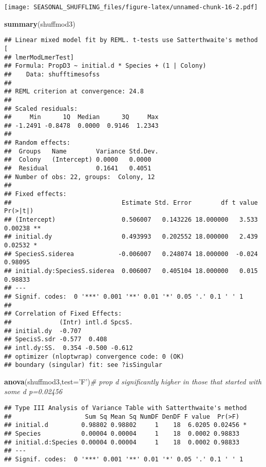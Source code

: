 \documentclass[]{article}
\newenvironment{Shaded}{\begin{snugshade}}{\end{snugshade}}
\newcommand{\CommentTok}[1]{\textcolor[rgb]{0.56,0.35,0.01}{\textit{#1}}}
\newcommand{\DataTypeTok}[1]{\textcolor[rgb]{0.13,0.29,0.53}{#1}}
\newcommand{\KeywordTok}[1]{\textcolor[rgb]{0.13,0.29,0.53}{\textbf{#1}}}
\newcommand{\NormalTok}[1]{#1}
\newcommand{\StringTok}[1]{\textcolor[rgb]{0.31,0.60,0.02}{#1}}
\begin{document}
\texttt{[image: SEASONAL\_SHUFFLING\_files/figure-latex/unnamed-chunk-16-2.pdf]}

\begin{Shaded}
\begin{Highlighting}[]
\KeywordTok{summary}\NormalTok{(shuffmod3) }
\end{Highlighting}
\end{Shaded}

\begin{verbatim}
## Linear mixed model fit by REML. t-tests use Satterthwaite's method [
## lmerModLmerTest]
## Formula: PropD3 ~ initial.d * Species + (1 | Colony)
##    Data: shufftimesofss
## 
## REML criterion at convergence: 24.8
## 
## Scaled residuals: 
##     Min      1Q  Median      3Q     Max 
## -1.2491 -0.8478  0.0000  0.9146  1.2343 
## 
## Random effects:
##  Groups   Name        Variance Std.Dev.
##  Colony   (Intercept) 0.0000   0.0000  
##  Residual             0.1641   0.4051  
## Number of obs: 22, groups:  Colony, 12
## 
## Fixed effects:
##                              Estimate Std. Error        df t value Pr(>|t|)   
## (Intercept)                  0.506007   0.143226 18.000000   3.533  0.00238 **
## initial.dy                   0.493993   0.202552 18.000000   2.439  0.02532 * 
## SpeciesS.siderea            -0.006007   0.248074 18.000000  -0.024  0.98095   
## initial.dy:SpeciesS.siderea  0.006007   0.405104 18.000000   0.015  0.98833   
## ---
## Signif. codes:  0 '***' 0.001 '**' 0.01 '*' 0.05 '.' 0.1 ' ' 1
## 
## Correlation of Fixed Effects:
##             (Intr) intl.d SpcsS.
## initial.dy  -0.707              
## SpecisS.sdr -0.577  0.408       
## intl.dy:SS.  0.354 -0.500 -0.612
## optimizer (nloptwrap) convergence code: 0 (OK)
## boundary (singular) fit: see ?isSingular
\end{verbatim}

\begin{Shaded}
\begin{Highlighting}[]
\KeywordTok{anova}\NormalTok{(shuffmod3,}\DataTypeTok{test=}\StringTok{'F'}\NormalTok{)}\CommentTok{# prop d significantly higher in those that started with some d p=0.02456}
\end{Highlighting}
\end{Shaded}

\begin{verbatim}
## Type III Analysis of Variance Table with Satterthwaite's method
##                    Sum Sq Mean Sq NumDF DenDF F value  Pr(>F)  
## initial.d         0.98802 0.98802     1    18  6.0205 0.02456 *
## Species           0.00004 0.00004     1    18  0.0002 0.98833  
## initial.d:Species 0.00004 0.00004     1    18  0.0002 0.98833  
## ---
## Signif. codes:  0 '***' 0.001 '**' 0.01 '*' 0.05 '.' 0.1 ' ' 1
\end{verbatim}
\end{document}
